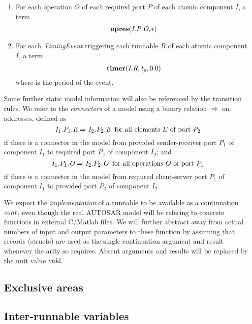 \documentclass[twocolumn]{article}
\begin{document}
\begin{enumerate}
\item For each operation $O$ of each required port $P$ of each atomic component $I$, a term
\[
\begin{array}{c}
  \Topres{\Tep{O}{P}{I}}{\epsilon}
\end{array}
\]

\item For each \emph{TimingEvent} triggering each runnable $R$ of each atomic component $I$, a term
\[
\begin{array}{c}
  \Ttimer{\Tr{R}{I}}{\V{T_p}}{0.0}
\end{array}
\]
where  is the period of the event.

\end{enumerate}

Some further static model information will also be referenced by the transition rules. We refer to the \emph{connectors} of a model using a binary relation $\Rightarrow$ on addresses, defined as
\[
  \Tconnect{\Tep{E}{$P_1$}{$I_1$}}{\Tep{E}{$P_2$}{$I_2$}} \;\;\text{for all elements $E$ of port $P_2$}
\]
if there is a connector in the model from provided sender-receiver port $P_1$ of component $I_1$ to required port $P_2$ of component $I_2$; and
\[
  \Tconnect{\Top{O}{$P_1$}{$I_1$}}{\Top{O}{$P_2$}{$I_2$}} \;\;\text{for all operations $O$ of port $P_1$}
\]
if there is a connector in the model from required client-server port $P_1$ of component $I_1$ to provided port $P_2$ of component $I_2$.

We expect the \emph{implementation} of a runnable to be available as a continuation $\Cont$, even though the real AUTOSAR model will be refering to concrete functions in external C/Matlab files. We will further abstract away from actual numbers of input and output parameters to these function by assuming that records (structs) are used as the single continuation argument and result whenever the arity so requires. Absent arguments and results will be replaced by the unit value $\Tvoid$.

\subsection{Exclusive areas}


\subsection{Inter-runnable variables}
\end{document}
